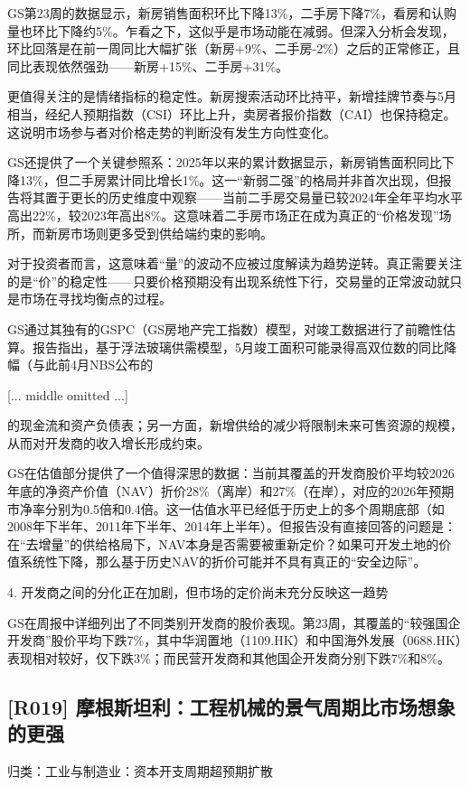 \documentclass[11pt]{ctexart}
\begin{document}
GS第23周的数据显示，新房销售面积环比下降13\%，二手房下降7\%，看房和认购量也环比下降约5\%。乍看之下，这似乎是市场动能在减弱。但深入分析会发现，环比回落是在前一周同比大幅扩张（新房+9\%、二手房-2\%）之后的正常修正，且同比表现依然强劲——新房+15\%、二手房+31\%。

更值得关注的是情绪指标的稳定性。新房搜索活动环比持平，新增挂牌节奏与5月相当，经纪人预期指数（CSI）环比上升，卖房者报价指数（CAI）也保持稳定。这说明市场参与者对价格走势的判断没有发生方向性变化。

GS还提供了一个关键参照系：2025年以来的累计数据显示，新房销售面积同比下降13\%，但二手房累计同比增长1\%。这一“新弱二强”的格局并非首次出现，但报告将其置于更长的历史维度中观察——当前二手房交易量已较2024年全年平均水平高出22\%，较2023年高出8\%。这意味着二手房市场正在成为真正的“价格发现”场所，而新房市场则更多受到供给端约束的影响。

对于投资者而言，这意味着“量”的波动不应被过度解读为趋势逆转。真正需要关注的是“价”的稳定性——只要价格预期没有出现系统性下行，交易量的正常波动就只是市场在寻找均衡点的过程。

GS通过其独有的GSPC（GS房地产完工指数）模型，对竣工数据进行了前瞻性估算。报告指出，基于浮法玻璃供需模型，5月竣工面积可能录得高双位数的同比降幅（与此前4月NBS公布的

[... middle omitted ...]

的现金流和资产负债表；另一方面，新增供给的减少将限制未来可售资源的规模，从而对开发商的收入增长形成约束。

GS在估值部分提供了一个值得深思的数据：当前其覆盖的开发商股价平均较2026年底的净资产价值（NAV）折价28\%（离岸）和27\%（在岸），对应的2026年预期市净率分别为0.5倍和0.4倍。这一估值水平已经低于历史上的多个周期底部（如2008年下半年、2011年下半年、2014年上半年）。但报告没有直接回答的问题是：在“去增量”的供给格局下，NAV本身是否需要被重新定价？如果可开发土地的价值系统性下降，那么基于历史NAV的折价可能并不具有真正的“安全边际”。

4. 开发商之间的分化正在加剧，但市场的定价尚未充分反映这一趋势

GS在周报中详细列出了不同类别开发商的股价表现。第23周，其覆盖的“较强国企开发商”股价平均下跌7\%，其中华润置地（1109.HK）和中国海外发展（0688.HK）表现相对较好，仅下跌3\%；而民营开发商和其他国企开发商分别下跌7\%和8\%。

\subsection{[R019] 摩根斯坦利：工程机械的景气周期比市场想象的更强}
{\small\color{refgray}归类：工业与制造业：资本开支周期超预期扩散}
\end{document}
